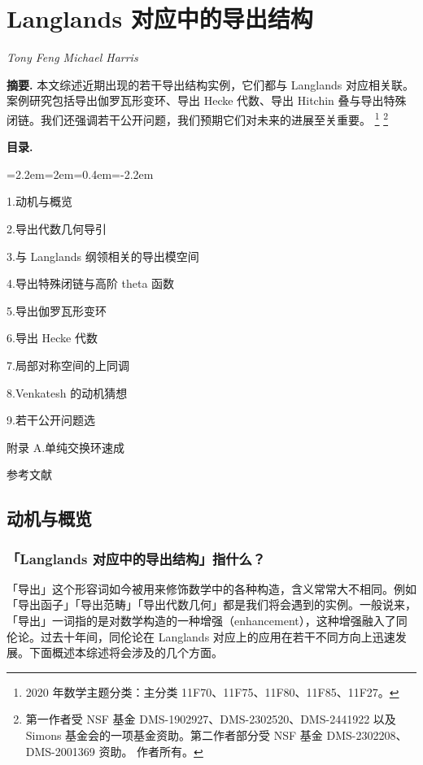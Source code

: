 \chapter{Langlands 对应中的导出结构}
\begin{center}
{\small\itshape Tony Feng \quad Michael Harris}
\end{center}
\medskip
\noindent\textbf{摘要.} 本文综述近期出现的若干导出结构实例，它们都与 Langlands 对应相关联。案例研究包括导出伽罗瓦形变环、导出 Hecke 代数、导出 Hitchin 叠与导出特殊闭链。我们还强调若干公开问题，我们预期它们对未来的进展至关重要。
\footnote{2020 年数学主题分类：主分类 11F70、11F75、11F80、11F85、11F27。}
\footnote{第一作者受 NSF 基金 DMS-1902927、DMS-2302520、DMS-2441922 以及 Simons 基金会的一项基金资助。第二作者部分受 NSF 基金 DMS-2302208、DMS-2001369 资助。 作者所有。}

\medskip
\noindent\textbf{目录.}
\begin{list}{}{\leftmargin=2.2em=2em=0.4em\itemindent=-2.2em}
\item 1.\quad 动机与概览
\item 2.\quad 导出代数几何导引
\item 3.\quad 与 Langlands 纲领相关的导出模空间
\item 4.\quad 导出特殊闭链与高阶 theta 函数
\item 5.\quad 导出伽罗瓦形变环
\item 6.\quad 导出 Hecke 代数
\item 7.\quad 局部对称空间的上同调
\item 8.\quad Venkatesh 的动机猜想
\item 9.\quad 若干公开问题选
\item 附录 A.\quad 单纯交换环速成
\item 参考文献
\end{list}

\section{动机与概览}

\subsection{「Langlands 对应中的导出结构」指什么？}

「导出」这个形容词如今被用来修饰数学中的各种构造，含义常常大不相同。例如「导出函子」「导出范畴」「导出代数几何」都是我们将会遇到的实例。一般说来，「导出」一词指的是对数学构造的一种增强（enhancement），这种增强融入了同伦论。过去十年间，同伦论在 Langlands 对应上的应用在若干不同方向上迅速发展。下面概述本综述将会涉及的几个方面。

